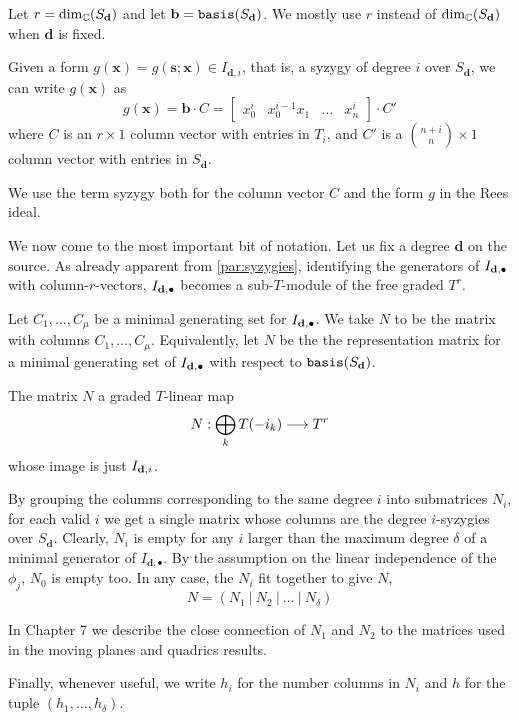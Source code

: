 \documentclass[fleqn,reqno]{amsart}
\begin{document}
\begin{paragraf}
\label{par:syzygies}
Let $r=\dim_{\mathbb{C}}(S_{\mathbf d})$ and
let $\mathbf b=\mathop{\tt basis}(S_{\mathbf d})$.
We mostly use $r$ instead of $\dim_{\mathbb{C}}(S_{\mathbf d})$ when $\mathbf d$ is fixed.

Given a form $g(\mathbf x)=g(\mathbf s;\mathbf x)\in I_{\mathbf d,i}$,
that is, a syzygy of degree $i$ over $S_{\mathbf d}$,
we can write $g(\mathbf x)$ as
\[
g(\mathbf x)=\mathbf b\cdot C=
\begin{bmatrix}
	x_0^i& x_0^{i-1}x_1& \ldots& x_n^i
\end{bmatrix}\cdot C'
\]
where $C$ is an $r\times1$ column vector with entries in $T_i$,
and $C'$ is a $\binom{n+i}{n}\times1$ column vector with entries in $S_{\mathbf d}$.

We use the term syzygy both for the column vector $C$ and the form $g$ in the
Rees ideal.
\end{paragraf}

\begin{paragraf}
\label{par:N-matrix}
We now come to the most important bit of notation.
Let us fix a degree $\mathbf d$ on the source.
As already apparent from \eqref{par:syzygies},
identifying the generators of $I_{\mathbf d,\bullet}$ with column-$r$-vectors,
$I_{\mathbf d,\bullet}$ becomes a sub-$T$-module of the free graded $T^r$.

Let $C_1,\ldots,C_\mu$ be a minimal generating set for $I_{\mathbf d,\bullet}$.
We take $N$ to be the matrix with columns $C_1,\ldots,C_\mu$.
Equivalently, let $N$ be the the representation matrix for a minimal
generating set of $I_{\mathbf d,\bullet}$ with respect to $\mathop{\tt basis}(S_\mathbf d)$.

The matrix $N$ a graded $T$-linear map
\[
N:\bigoplus_{k} T(-i_k)\longrightarrow T^r
\]
whose image is just $I_{\mathbf d,i}$.

By grouping the columns corresponding to the same degree $i$ into submatrices $N_i$,
for each valid $i$ we get a single matrix whose columns are the degree $i$-syzygies over $S_{\mathbf d}$.
Clearly, $N_i$ is empty for any $i$ larger than the maximum degree $\delta$ of a minimal generator
of $I_{\mathbf d,\bullet}$.
By the assumption on the linear independence of the $\phi_j$, $N_0$ is empty too.
In any case, the $N_i$ fit together to give $N$,
\[
	N=(N_1~|~N_2~|~\ldots~|~N_\delta)
\]

In Chapter 7 we describe the close connection of $N_1$ and $N_2$ to the matrices used in
the moving planes and quadrics results.

Finally, whenever useful, we write $h_i$ for the number columns in $N_i$
and $h$ for the tuple $(h_1,\ldots,h_\delta)$.
\end{paragraf}
\end{document}
